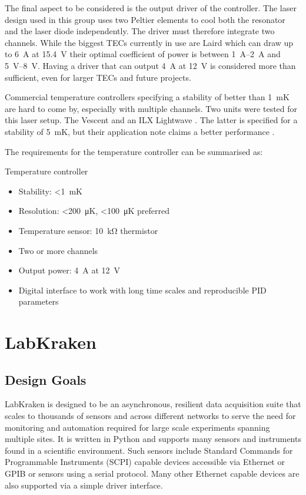 The final aspect to be considered is the output driver of the controller. The laser design used in this group uses two Peltier elements to cool both the resonator and the laser diode independently. The driver must therefore integrate two channels. While the biggest TECs currently in use are Laird  which can draw up to \qty{6}{\A} at \qty{15.4}{\V} \cite{datasheet_tec} their optimal coefficient of power is between \qtyrange[range-units = single]{1}{2}{\A} and \qtyrange[range-units = single]{5}{8}{\V}. Having a driver that can output \qty{4}{\A} at \qty{12}{\V} is considered more than sufficient, even for larger TECs and future projects.

Commercial temperature controllers specifying a stability of better than \qty{1}{\milli \kelvin} are hard to come by, especially with multiple channels. Two units were tested for this laser setup. The Vescent  and an ILX Lightwave . The latter is specified for a stability of \qty{5}{\milli \kelvin}, but their application note claims a better performance \cite{appnote_ilx_millikelvin}.

The requirements for the temperature controller can be summarised as:
\begin{center}
    \begin{specifications}[label={lst:dgTemp_requirements}]{Temperature controller}
    \begin{itemize}
        \item Stability: \qty{<1}{\milli \K}
        \item Resolution: \qty{<200}{\micro \K}, \qty{<100}{\micro \K} preferred
        \item Temperature sensor: \qty{10}{\kilo \ohm} thermistor
        \item Two or more channels
        \item Output power: \qty{4}{\A} at \qty{12}{\V}
        \item Digital interface to work with long time scales and reproducible PID parameters
    \end{itemize}
    \end{specifications}
\end{center}

\clearpage
\section{LabKraken}%
\label{sec:prep_labkraken}
\subsection{Design Goals}
LabKraken is designed to be an asynchronous, resilient data acquisition suite that scales to thousands of sensors and across different networks to serve the need for monitoring and automation required for large scale experiments spanning multiple sites. It is written in Python and supports many sensors and instruments found in a scientific environment. Such sensors include Standard Commands for Programmable Instruments (SCPI) capable devices accessible via Ethernet or GPIB or sensors using a serial protocol. Many other Ethernet capable devices are also supported via a simple driver interface.

